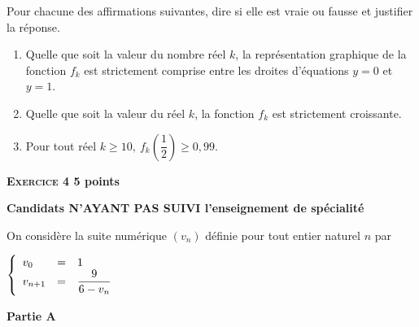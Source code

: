\documentclass[10pt]{article}
\begin{document}
Pour chacune des affirmations suivantes, dire si elle est vraie ou fausse et justifier la réponse.

\medskip
 
\begin{enumerate}
\item Quelle que soit la valeur du nombre réel $k$, la représentation graphique de la fonction $f_{k}$ est strictement comprise entre les droites d'équations $y = 0$ et $y = 1$. 
\item Quelle que soit la valeur du réel $k$, la fonction $f_{k}$ est strictement croissante. 
\item Pour tout réel $k \geqslant 10,\: f_{k}\left(\dfrac{1}{2}\right) \geqslant  0,99$. 
\end{enumerate} 

\vspace{0,5cm}

\textbf{\textsc{Exercice 4} \hfill 5 points}

\textbf{Candidats N'AYANT PAS SUIVI l'enseignement de spécialité}
 
\medskip


On considère la suite numérique $\left(v_{n}\right)$ définie pour tout entier naturel $n$ par 

$\left\{\begin{array}{l c l}
v_{0} &=& 1\\ 	 
v_{n + 1}&=& \dfrac{9}{6 - v_{n}}
\end{array}\right.$ 

\bigskip

\textbf{Partie A}

\medskip
 
\end{document}
